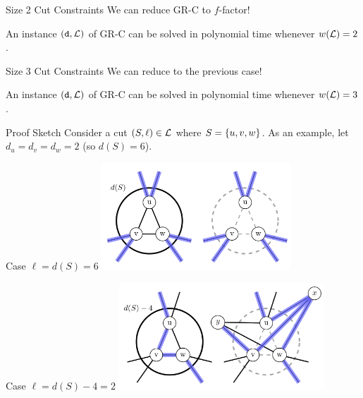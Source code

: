 \begin{frame}{Size 2 Cut Constraints}
    \centering
    We can reduce GR-C to $f$-factor!
    \pause
    \bigbreak
    \begin{lemma}[1]
        An instance $(\texttt{d}, \mathcal{L})$ of GR-C can be solved in polynomial time whenever $w(\mathcal{L}) = 2$.
    \end{lemma}
\end{frame}

\begin{frame}{Size 3 Cut Constraints}
    \centering
    We can reduce to the previous case!
    \pause
    \bigbreak
    \begin{theorem}[2]
        An instance $(\texttt{d}, \mathcal{L})$ of GR-C can be solved in polynomial time whenever $w(\mathcal{L}) = 3$.
    \end{theorem}
\end{frame}

\begin{frame}{Proof Sketch}
    \centering
    Consider a cut $(S, \ell) \in \mathcal{L}$ where $S = \{u, v, w\}$.
    \pause
    \bigbreak
    As an example, let $d_u = d_v = d_w = 2$ (so $d(S) = 6$).
\end{frame}

\begin{frame}{Case $\ell = d(S) = 6$}
    \centering
    \includegraphics[height=4cm]{images/3cut1.png}
\end{frame}

\begin{frame}{Case $\ell = d(S) - 4 = 2$}
    \centering
    \includegraphics[height=4cm]{images/3cut4.png}
\end{frame}

